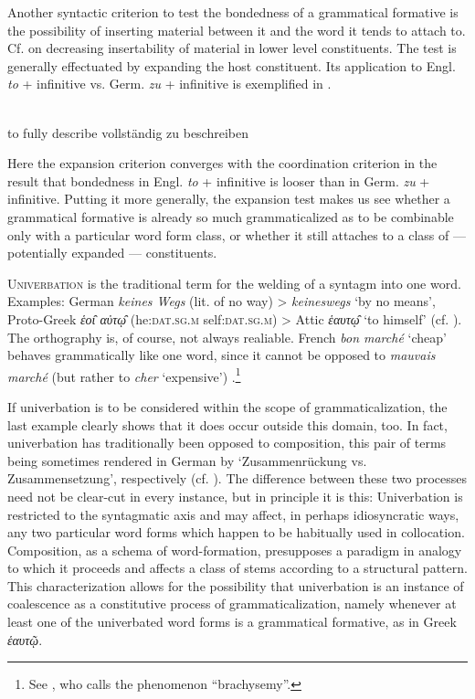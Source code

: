 Another syntactic criterion to test the bondedness of a grammatical formative is the possibility of inserting material between it and the word it tends to attach to. Cf. \citet{Zwicky1978} on decreasing insertability of material in lower level constituents. The test is generally effectuated by expanding the host constituent. Its application to Engl. \textit{to} + infinitive vs. Germ. \textit{zu} + infinitive is exemplified in .

\ea\label{ex:E108}
\langinfo{\LangGerm}{}{}\\
 \ea to fully describe
 \ex vollständig zu beschreiben\\
\z
\z 

\noindent Here the expansion criterion converges with the coordination criterion in the result that bondedness in Engl. \textit{to} + infinitive is looser than in Germ. \textit{zu} + infinitive. Putting it more generally, the expansion test makes us see whether a grammatical formative is already so much grammaticalized as to be combinable only with a particular word form class, or whether it still attaches to a class of — potentially expanded — constituents.

\textsc{Univerbation} is the traditional term for the welding of a syntagm into one word. Examples: German \textit{keines Wegs} (lit. of no way) {\textgreater} \textit{keineswegs} ‘by no means’, Proto-Greek \textit{ἑο\newtie{ɩ} αὐτ\newtie{ῳ}} (he:\textsc{dat.sg.m} self:\textsc{dat.sg.m}) {\textgreater} Attic \textit{ἑαυτ\newtie{ῳ}} ‘to himself’ (cf. \citealt[\textsc{ii}:82]{Wackernagel1920}). The orthography is, of course, not always realiable. French \textit{bon marché} ‘cheap’ behaves grammatically like one word, since it cannot be opposed to \textit{mauvais marché} (but rather to \textit{cher} ‘expensive’)%
.\footnote{See \citet[109f]{Frei1929}, who calls the phenomenon ``brachysemy''.}

If univerbation is to be considered within the scope of grammaticalization, the last example clearly shows that it does occur outside this domain, too. In fact, univerbation has traditionally been opposed to composition, this pair of terms being sometimes rendered in German by ‘Zusammenrückung vs. Zusammensetzung’, respectively (cf. \citealt[88]{Žirmunskij1966}). The difference between these two processes need not be clear-cut in every instance, but in principle it is this: Univerbation is restricted to the syntagmatic axis and may affect, in perhaps idiosyncratic ways, any two particular word forms which happen to be habitually used in collocation. Composition, as a schema of word-formation, presupposes a paradigm in analogy to which it proceeds and affects a class of stems according to a structural pattern. This characterization allows for the possibility that univerbation is an instance of coalescence as a constitutive process of grammaticalization, namely whenever at least one of the univerbated word forms is a grammatical formative, as in Greek \textit{ἑαυτῷ}.

